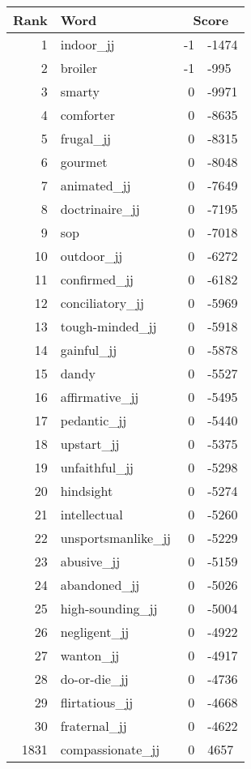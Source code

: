 \begin{longtable}[!htbp]{| rlr@{.}l |}
    \hline
    \textbf{Rank} & \textbf{Word} & \multicolumn{2}{c|}{\textbf{Score}} \\
    \hline
    \endhead
    1 & indoor\_jj & -1 & -1474 \\
    2 & broiler & -1 & -995 \\
    3 & smarty & 0 & -9971 \\
    4 & comforter & 0 & -8635 \\
    5 & frugal\_jj & 0 & -8315 \\
    6 & gourmet & 0 & -8048 \\
    7 & animated\_jj & 0 & -7649 \\
    8 & doctrinaire\_jj & 0 & -7195 \\
    9 & sop & 0 & -7018 \\
    10 & outdoor\_jj & 0 & -6272 \\
    11 & confirmed\_jj & 0 & -6182 \\
    12 & conciliatory\_jj & 0 & -5969 \\
    13 & tough-minded\_jj & 0 & -5918 \\
    14 & gainful\_jj & 0 & -5878 \\
    15 & dandy & 0 & -5527 \\
    16 & affirmative\_jj & 0 & -5495 \\
    17 & pedantic\_jj & 0 & -5440 \\
    18 & upstart\_jj & 0 & -5375 \\
    19 & unfaithful\_jj & 0 & -5298 \\
    20 & hindsight & 0 & -5274 \\
    21 & intellectual & 0 & -5260 \\
    22 & unsportsmanlike\_jj & 0 & -5229 \\
    23 & abusive\_jj & 0 & -5159 \\
    24 & abandoned\_jj & 0 & -5026 \\
    25 & high-sounding\_jj & 0 & -5004 \\
    26 & negligent\_jj & 0 & -4922 \\
    27 & wanton\_jj & 0 & -4917 \\
    28 & do-or-die\_jj & 0 & -4736 \\
    29 & flirtatious\_jj & 0 & -4668 \\
    30 & fraternal\_jj & 0 & -4622 \\
    1831 & compassionate\_jj & 0 & 4657 \\

\end{longtable}
